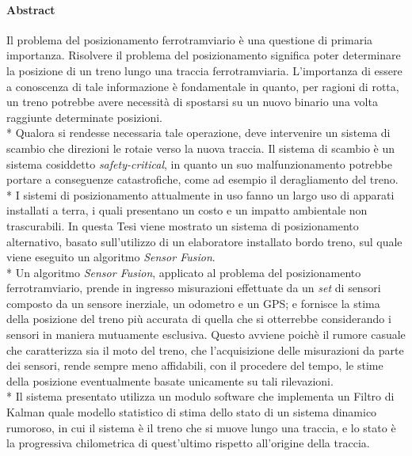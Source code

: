 \paragraph{Abstract}
Il problema del posizionamento ferrotramviario \`e una questione di primaria importanza. Risolvere il problema del posizionamento significa poter determinare la posizione di un treno lungo una traccia ferrotramviaria. L'importanza di essere a conoscenza di tale informazione \`e fondamentale in quanto, per ragioni di rotta, un treno potrebbe avere necessit\`a di spostarsi su un nuovo binario una volta raggiunte determinate posizioni.\\*
Qualora si rendesse necessaria tale operazione, deve intervenire un sistema di scambio che direzioni le rotaie verso la nuova traccia. Il sistema di scambio \`e un sistema cosiddetto \emph{safety-critical}, in quanto un suo malfunzionamento potrebbe portare a conseguenze catastrofiche, come ad esempio il deragliamento del treno.\\*
I sistemi di posizionamento attualmente in uso fanno un largo uso di apparati installati a terra, i quali presentano un costo e un impatto ambientale non trascurabili. In questa Tesi viene mostrato un sistema di posizionamento alternativo, basato sull'utilizzo di un elaboratore installato bordo treno, sul quale viene eseguito un algoritmo \emph{Sensor Fusion}.\\*
Un algoritmo \emph{Sensor Fusion}, applicato al problema del posizionamento ferrotramviario, prende in ingresso misurazioni effettuate da un \emph{set} di sensori composto da un sensore inerziale, un odometro e un GPS; e fornisce la stima della posizione del treno pi\`u accurata di quella che si otterrebbe considerando i sensori in maniera mutuamente esclusiva. Questo avviene poich\`e il rumore casuale che caratterizza sia il moto del treno, che l'acquisizione delle misurazioni da parte dei sensori, rende sempre meno affidabili, con il procedere del tempo, le stime della posizione eventualmente basate unicamente su tali rilevazioni.\\*
Il sistema presentato utilizza un modulo software che implementa un Filtro di Kalman quale modello statistico di stima dello stato di un sistema dinamico rumoroso, in cui il sistema \`e il treno che si muove lungo una traccia, e lo stato \`e la progressiva chilometrica di quest'ultimo rispetto all'origine della traccia.